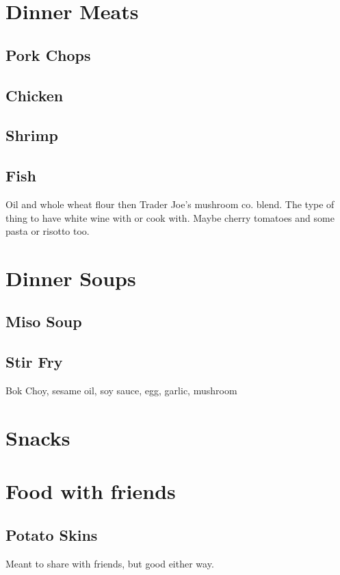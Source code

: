 \documentclass{article}
\begin{document}
\section*{Dinner Meats}

\subsection*{Pork Chops}

\subsection*{Chicken}

\subsection*{Shrimp}

\subsection*{Fish}
Oil and whole wheat flour then Trader Joe's mushroom co. blend. The type of thing to have white wine with or cook with. Maybe cherry tomatoes and some pasta or risotto too. 

\section{Dinner Soups} 

\subsection*{Miso Soup}

\subsection*{Stir Fry}
Bok Choy, sesame oil, soy sauce, egg, garlic, mushroom 
\section*{Snacks}


\section*{Food with friends}

\subsection*{Potato Skins} 
Meant to share with friends, but good either way. \\
\end{document}
